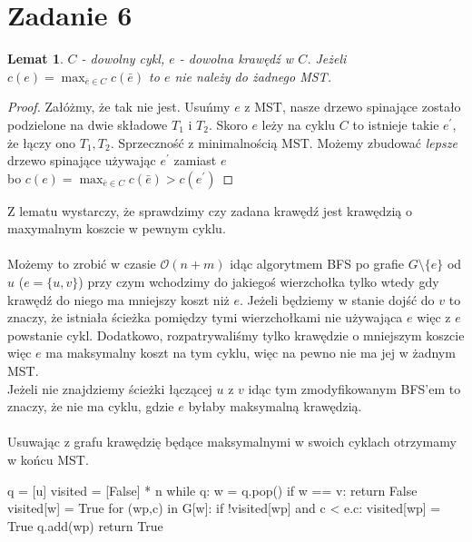 \documentclass{article}
\newtheorem{lemma}{Lemat}
\begin{document}
\section{Zadanie 6}
\begin{lemma}
$C$ - dowolny cykl, $e$ - dowolna krawędź w $C$. Jeżeli $c(e) = \max_{\bar{e} \in C} c(\bar{e})$ to $e$ nie należy do żadnego MST.
\end{lemma}
\begin{proof}
Załóżmy, że tak nie jest. Usuńmy $e$ z MST, nasze drzewo spinające zostało podzielone na dwie składowe $T_1$ i $T_2$. Skoro $e$ leży na cyklu $C$ to istnieje takie $e^\prime$, że łączy ono $T_1, T_2$. Sprzeczność z minimalnością MST. Możemy zbudować \textit{lepsze} drzewo spinające używając $e^\prime$ zamiast $e$ \\bo $c(e) = \max_{\bar{e} \in C} c(\bar{e}) > c(e^\prime)$
\end{proof}
Z lematu wystarczy, że sprawdzimy czy zadana krawędź jest krawędzią o maxymalnym koszcie w pewnym cyklu.\\\\
Możemy to zrobić w czasie $\mathcal{O}(n + m)$ idąc algorytmem BFS po grafie $G \setminus \{e\}$ od $u$ ($e = \{u,v\}$) przy czym wchodzimy do jakiegoś wierzchołka tylko wtedy gdy krawędź do niego ma mniejszy koszt niż $e$. Jeżeli będziemy w stanie dojść do $v$ to znaczy, że istniała ścieżka pomiędzy tymi wierzchołkami nie używająca $e$ więc z $e$ powstanie cykl. Dodatkowo, rozpatrywaliśmy tylko krawędzie o mniejszym koszcie więc $e$ ma maksymalny koszt na tym cyklu, więc na pewno nie ma jej w żadnym MST.\\
Jeżeli nie znajdziemy ścieżki łączącej $u$ z $v$ idąc tym zmodyfikowanym BFS'em to znaczy, że nie ma cyklu, gdzie $e$ byłaby maksymalną krawędzią.\\\\
Usuwając z grafu krawędzię będące maksymalnymi w swoich cyklach otrzymamy w końcu MST.
\begin{python}
q = [u]
visited = [False] * n
while q:
    w = q.pop()
    if w == v:
        return False
    visited[w] = True
    for (wp,c) in G[w]:
        if !visited[wp] and c < e.c:
            visited[wp] = True
            q.add(wp)
return True
\end{python}
\clearpage
\end{document}
